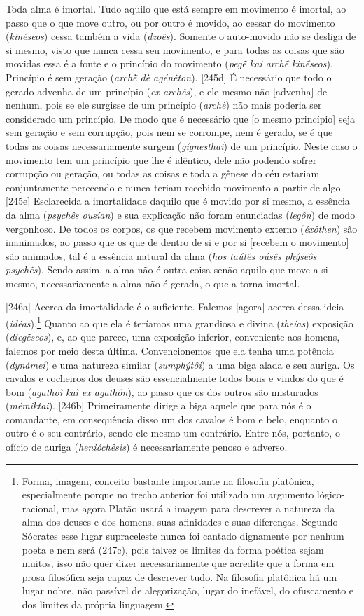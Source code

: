 Toda alma é imortal. Tudo aquilo que está sempre em movimento é imortal,
ao passo que o que move outro, ou por outro é movido, ao cessar do
movimento (\emph{kinéseos}) cessa também a vida (\emph{dzōẽs}). Somente
o auto-movido não se desliga de si mesmo, visto que nunca cessa seu
movimento, e para todas as coisas que são movidas essa é a fonte e o
princípio do movimento (\emph{pegḗ kai archḗ kinḗseos}). Princípio é sem
geração (\emph{archḕ dè agénêton}). {[}245d{]} É necessário que todo o
gerado advenha de um princípio (\emph{ex archês}), e ele mesmo não
{[}advenha{]} de nenhum, pois se ele surgisse de um princípio
(\emph{archè}) não mais poderia ser considerado um princípio. De modo
que é necessário que {[}o mesmo princípio{]} seja sem geração e sem
corrupção, pois nem se corrompe, nem é gerado, se é que todas as coisas
necessariamente surgem (\emph{gígnesthai}) de um princípio. Neste caso o
movimento tem um princípio que lhe é idêntico, dele não podendo sofrer
corrupção ou geração, ou todas as coisas e toda a gênese do céu estariam
conjuntamente perecendo e nunca teriam recebido movimento a partir de
algo. {[}245e{]} Esclarecida a imortalidade daquilo que é movido por si
mesmo, a essência da alma (\emph{psychês ousían}) e sua explicação não
foram enunciadas (\emph{legôn}) de modo vergonhoso. De todos os corpos,
os que recebem movimento externo (\emph{éxôthen}) são inanimados, ao
passo que os que de dentro de si e por si {[}recebem o movimento{]} são
animados, tal é a essência natural da alma (\emph{hos taútês oúsês
phýseôs psychês}). Sendo assim, a alma não é outra coisa senão aquilo
que move a si mesmo, necessariamente a alma não é gerada, o que a torna
imortal.

{[}246a{]} Acerca da imortalidade é o suficiente. Falemos {[}agora{]}
acerca dessa ideia (\emph{idéas}).\footnote{Forma, imagem, conceito
  bastante importante na filosofia platônica, especialmente porque no
  trecho anterior foi utilizado um argumento lógico-racional, mas agora
  Platão usará a imagem para descrever a natureza da alma dos deuses e
  dos homens, suas afinidades e suas diferenças. Segundo Sócrates esse
  lugar supraceleste nunca foi cantado dignamente por nenhum poeta e nem
  será (247c), pois talvez os limites da forma poética sejam muitos,
  isso não quer dizer necessariamente que acredite que a forma em prosa
  filosófica seja capaz de descrever tudo. Na filosofia platônica há um
  lugar nobre, não passível de alegorização, lugar do inefável, do
  ofuscamento e dos limites da própria linguagem.} Quanto ao que ela é
teríamos uma grandiosa e divina (\emph{theías}) exposição
(\emph{diegḗseos}), e, ao que parece, uma exposição inferior,
conveniente aos homens, falemos por meio desta última. Convencionemos
que ela tenha uma potência (\emph{dynámei}) e uma natureza similar
(\emph{sumphýtôi}) a uma biga alada e seu auriga. Os cavalos e cocheiros
dos deuses são essencialmente todos bons e vindos do que é bom
(\emph{agathoì kaì ex agathôn}), ao passo que os dos outros são
misturados (\emph{mémiktai}). {[}246b{]} Primeiramente dirige a biga
aquele que para nós é o comandante, em consequência disso um dos cavalos
é bom e belo, enquanto o outro é o seu contrário, sendo ele mesmo um
contrário. Entre nós, portanto, o ofício de auriga (\emph{henióchêsis})
é necessariamente penoso e adverso.

